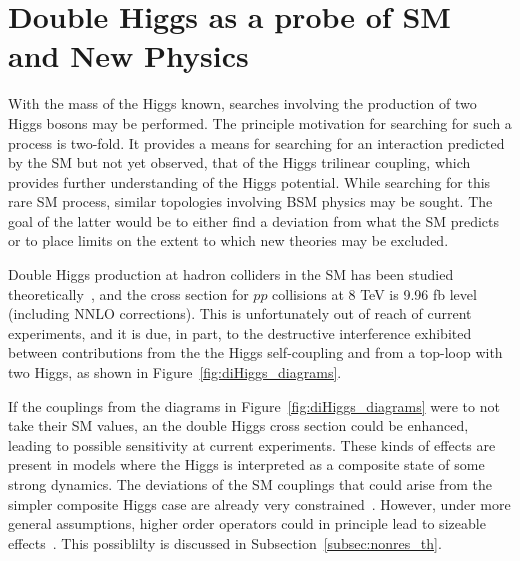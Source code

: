 \section{Double Higgs as a probe of SM and New Physics\label{sec:diHiggs}}

With the mass of the Higgs known, searches involving the production of two Higgs bosons may
be performed. The principle motivation for searching for such a process is two-fold.
It provides a means for searching for an interaction predicted by the SM but not yet observed, that
of the Higgs trilinear coupling, which provides further understanding of the Higgs potential.
While searching for this rare SM process, similar topologies involving BSM physics may
be sought. The goal of the latter would be to either find a deviation from what the SM predicts
or to place limits on the extent to which new theories may be excluded.

Double Higgs production at hadron colliders in the SM has been studied
theoretically~\cite{Baglio:2012np,Plehn:1996wb}, and the cross section for $pp$ collisions at 8 TeV
is 9.96 fb level (including NNLO corrections). This is unfortunately out of reach of current
experiments, and it is due, in part, to the destructive interference exhibited between contributions
from the the Higgs self-coupling and from a top-loop with two Higgs, as shown in
Figure~\ref{fig:diHiggs_diagrams}.

If the couplings from the diagrams in Figure~\ref{fig:diHiggs_diagrams} were to not take their SM
values, an the double Higgs cross section could be enhanced, leading to possible sensitivity
at current experiments. These kinds of effects are present in models
where the Higgs is interpreted as a composite state of some strong dynamics. The deviations
of the SM couplings that could arise from the simpler composite Higgs case are
already very constrained~\cite{Ellis:2013ywa,Ellis:2013lra}.
However, under more general assumptions, higher order
operators could in principle lead to sizeable effects~\cite{Belyaev:1999mx,Dib:2005re,Oliveira:2010uv}.
This possiblilty is discussed in Subsection~\ref{subsec:nonres_th}.

